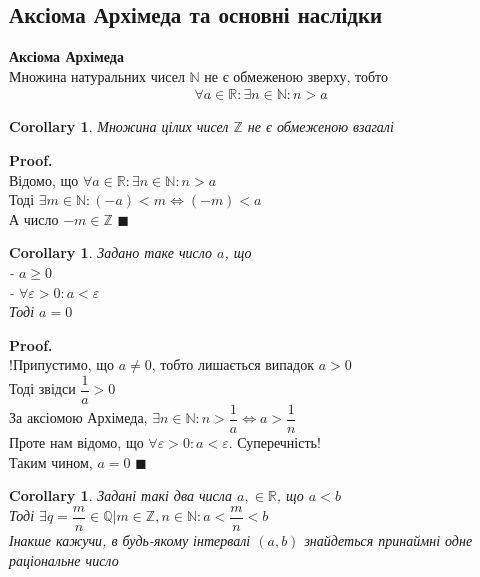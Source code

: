 \documentclass[a4paper, 14pt]{extarticle}
\theoremstyle{theoremdd}
\theoremstyle{theoremdd}
\theoremstyle{theoremdd}
\theoremstyle{theoremdd}
\theoremstyle{theoremdd}
\theoremstyle{theoremdd}
\theoremstyle{theoremdd}
\theoremstyle{theoremdd}
\newtheorem{corollary}[theorem]{Corollary}
\newenvironment{pf}{\vspace*{-3mm} \textbf{Proof. \\}}{$\blacksquare$}
\begin{document}
	\subsection{Аксіома Архімеда та основні наслідки}
	\textbf{Аксіома Архімеда}\\
	Множина натуральних чисел $\mathbb{N}$ не є обмеженою зверху, тобто
	\begin{align*}
	\forall a \in \mathbb{R}: \exists n \in \mathbb{N}: n > a
	\end{align*}
	
	\begin{corollary}
	Множина цілих чисел $\mathbb{Z}$ не є обмеженою взагалі
	\end{corollary}
	\begin{pf}
	Відомо, що $\forall a \in \mathbb{R}: \exists n \in \mathbb{N}: n > a$\\
	Тоді $\exists m \in \mathbb{N}: (-a) < m \iff (-m) < a$\\
	А число $-m \in \mathbb{Z}$
	\end{pf}
	
	\begin{corollary}
	Задано таке число $a$, що\\
	- $a \geq 0$ \\
	- $\forall \varepsilon > 0: a < \varepsilon$\\
	Тоді $a = 0$
	\end{corollary}
	
	\begin{pf}
	!Припустимо, що $a \neq 0$, тобто лишається випадок $a > 0$\\
	Тоді звідси $\dfrac{1}{a} > 0$\\
	За аксіомою Архімеда, $\exists n \in \mathbb{N}: n > \dfrac{1}{a} \iff a > \dfrac{1}{n}$\\
	Проте нам відомо, що $\forall \varepsilon > 0: a < \varepsilon$. Суперечність!\\
	Таким чином, $a = 0$
	\end{pf}
	
	\begin{corollary}
	Задані такі два числа $a, \in \mathbb{R}$, що $a < b$\\
	Тоді $\exists q = \dfrac{m}{n} \in \mathbb{Q} | m \in \mathbb{Z}, n \in \mathbb{N}: a < \dfrac{m}{n} < b$\\
	Інакше кажучи, в будь-якому інтервалі $(a,b)$ знайдеться принаймні одне раціональне число
	\end{corollary}
	
\end{document}
